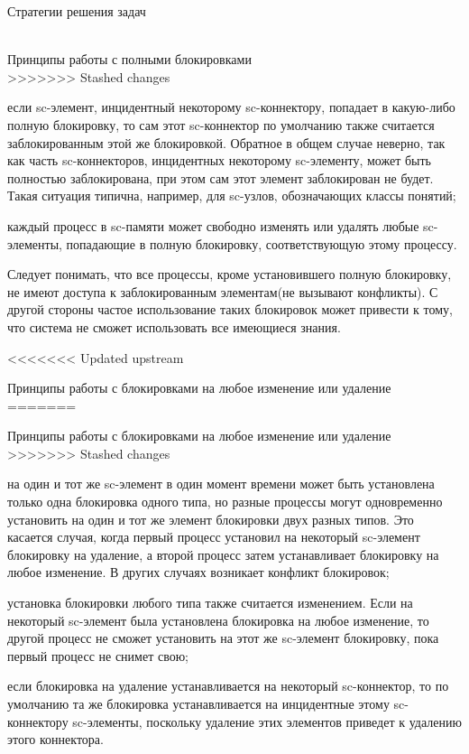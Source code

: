 \begin{frame}{Стратегии решения задач}
\begin{frame}{\\Принципы работы с полными блокировками}
\topline
    \vspace{30}
     \\

>>>>>>> Stashed changes
    \begin{textitemize}
	\item если sc-элемент, инцидентный некоторому sc-коннектору, попадает в какую-либо полную блокировку, то сам этот sc-коннектор по умолчанию также считается заблокированным этой же блокировкой. Обратное в общем случае неверно, так как часть sc-коннекторов, инцидентных некоторому sc-элементу, может быть полностью заблокирована, при этом сам этот элемент заблокирован не будет. Такая ситуация типична, например, для sc-узлов, обозначающих классы понятий;
	\item каждый процесс в sc-памяти может свободно изменять или удалять любые sc-элементы, попадающие в полную блокировку, соответствующую этому процессу.
\end{textitemize}
Следует понимать, что все процессы, кроме установившего полную блокировку, не имеют доступа к заблокированным элементам(не вызывают конфликты). С другой стороны частое использование таких блокировок может привести к тому, что система не сможет использовать все имеющиеся знания.
\end{frame}

<<<<<<< Updated upstream
\begin{frame}{\large Принципы работы с блокировками на любое изменение или удаление}
\vspace{18}
=======
\begin{frame}{Принципы работы с блокировками на любое изменение или удаление}
\topline
\vspace{30}
 \\

>>>>>>> Stashed changes
    \begin{textitemize}
	\item на один и тот же sc-элемент в один момент времени может быть установлена только одна блокировка одного типа, но разные процессы могут одновременно установить на один и тот же элемент блокировки двух разных типов. Это касается случая, когда первый процесс установил на некоторый sc-элемент блокировку на удаление, а второй процесс затем устанавливает блокировку на любое изменение. В других случаях возникает конфликт блокировок;
	\item установка блокировки любого типа также считается изменением. Если на некоторый \mbox{sc-элемент} была установлена блокировка на любое изменение, то другой процесс не сможет установить на этот же sc-элемент блокировку, пока первый процесс не снимет свою;
	\item если блокировка на удаление устанавливается на некоторый sc-коннектор, то по умолчанию та же блокировка устанавливается на инцидентные этому sc-коннектору sc-элементы, поскольку удаление этих элементов приведет к удалению этого коннектора.
\end{textitemize}
\end{frame}


\end{frame}
\end{frame}
